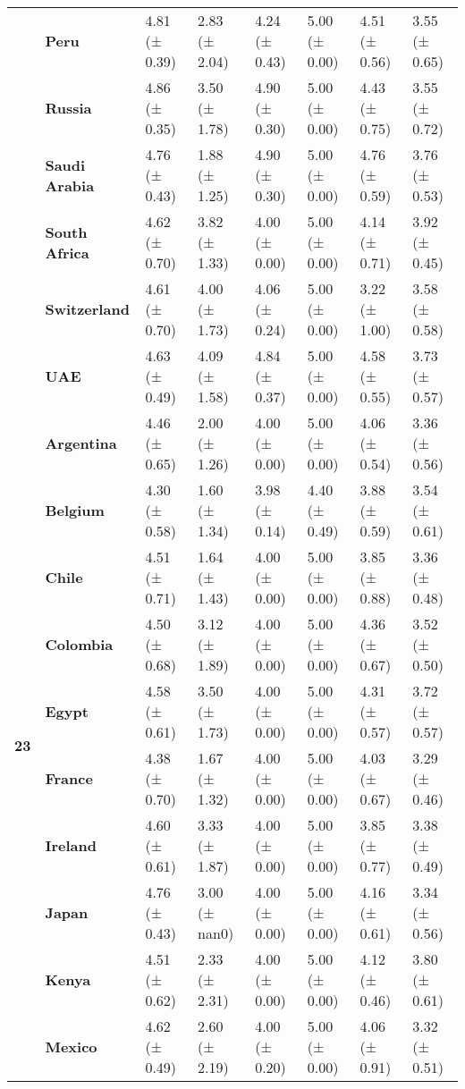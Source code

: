 \begin{longtable}{llllllll}
\textbf{} & \textbf{Peru} & 4.81 (± 0.39) & 2.83 (± 2.04) & 4.24 (± 0.43) & 5.00 (± 0.00) & 4.51 (± 0.56) & 3.55 (± 0.65) \\
\textbf{} & \textbf{Russia} & 4.86 (± 0.35) & 3.50 (± 1.78) & 4.90 (± 0.30) & 5.00 (± 0.00) & 4.43 (± 0.75) & 3.55 (± 0.72) \\
\textbf{} & \textbf{Saudi Arabia} & 4.76 (± 0.43) & 1.88 (± 1.25) & 4.90 (± 0.30) & 5.00 (± 0.00) & 4.76 (± 0.59) & 3.76 (± 0.53) \\
\textbf{} & \textbf{South Africa} & 4.62 (± 0.70) & 3.82 (± 1.33) & 4.00 (± 0.00) & 5.00 (± 0.00) & 4.14 (± 0.71) & 3.92 (± 0.45) \\
\textbf{} & \textbf{Switzerland} & 4.61 (± 0.70) & 4.00 (± 1.73) & 4.06 (± 0.24) & 5.00 (± 0.00) & 3.22 (± 1.00) & 3.58 (± 0.58) \\
\textbf{} & \textbf{UAE} & 4.63 (± 0.49) & 4.09 (± 1.58) & 4.84 (± 0.37) & 5.00 (± 0.00) & 4.58 (± 0.55) & 3.73 (± 0.57) \\
\cline{1-8}
\multirow[t]{19}{*}{\textbf{23}} & \textbf{Argentina} & 4.46 (± 0.65) & 2.00 (± 1.26) & 4.00 (± 0.00) & 5.00 (± 0.00) & 4.06 (± 0.54) & 3.36 (± 0.56) \\
\textbf{} & \textbf{Belgium} & 4.30 (± 0.58) & 1.60 (± 1.34) & 3.98 (± 0.14) & 4.40 (± 0.49) & 3.88 (± 0.59) & 3.54 (± 0.61) \\
\textbf{} & \textbf{Chile} & 4.51 (± 0.71) & 1.64 (± 1.43) & 4.00 (± 0.00) & 5.00 (± 0.00) & 3.85 (± 0.88) & 3.36 (± 0.48) \\
\textbf{} & \textbf{Colombia} & 4.50 (± 0.68) & 3.12 (± 1.89) & 4.00 (± 0.00) & 5.00 (± 0.00) & 4.36 (± 0.67) & 3.52 (± 0.50) \\
\textbf{} & \textbf{Egypt} & 4.58 (± 0.61) & 3.50 (± 1.73) & 4.00 (± 0.00) & 5.00 (± 0.00) & 4.31 (± 0.57) & 3.72 (± 0.57) \\
\textbf{} & \textbf{France} & 4.38 (± 0.70) & 1.67 (± 1.32) & 4.00 (± 0.00) & 5.00 (± 0.00) & 4.03 (± 0.67) & 3.29 (± 0.46) \\
\textbf{} & \textbf{Ireland} & 4.60 (± 0.61) & 3.33 (± 1.87) & 4.00 (± 0.00) & 5.00 (± 0.00) & 3.85 (± 0.77) & 3.38 (± 0.49) \\
\textbf{} & \textbf{Japan} & 4.76 (± 0.43) & 3.00 (± nan0) & 4.00 (± 0.00) & 5.00 (± 0.00) & 4.16 (± 0.61) & 3.34 (± 0.56) \\
\textbf{} & \textbf{Kenya} & 4.51 (± 0.62) & 2.33 (± 2.31) & 4.00 (± 0.00) & 5.00 (± 0.00) & 4.12 (± 0.46) & 3.80 (± 0.61) \\
\textbf{} & \textbf{Mexico} & 4.62 (± 0.49) & 2.60 (± 2.19) & 4.00 (± 0.20) & 5.00 (± 0.00) & 4.06 (± 0.91) & 3.32 (± 0.51) \\

\end{longtable}
